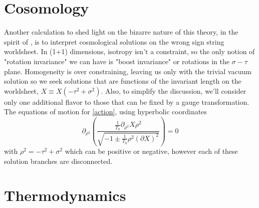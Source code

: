 \documentclass[%
 reprint,
 amsmath,amssymb,
 aps,
]{revtex4-1}
\begin{document}
\section{Cosomology}

Another calculation to shed light on the bizarre nature of this theory, in the spirit of \cite{Dubovsky:2012wk},
is to interpret cosmological solutions on the wrong sign string worldsheet. In (1+1) dimensions, isotropy isn't
a constraint, so the only notion of "rotation invariance" we can have is "boost invariance" or rotations in the
$\sigma-\tau$ plane.  Homogeneity is over constraining, leaving us only with the trivial vacuum solution so we seek
solutions that are functions of the invariant length on the worldsheet, $X \equiv X(-\tau^2 + \sigma^2)$.  Also, to
simplify the discussion, we'll consider only one additional flavor to those that can be fixed by a gauge
transformation. The equations of motion for \ref{action}, using hyperbolic coordinates
\begin{equation}
    \partial_{\rho^2} \left( \frac{\frac{1}{T_0} \partial_{\rho^2} X \rho^2}{\sqrt{-1 \pm \frac{1}{T_0} \rho^2 (\partial X)^2}} \right) = 0
\end{equation}
with $\rho^2 = -\tau^2 + \sigma^2$ which can be positive or negative, however each of these solution branches are disconnected.
\section{Thermodynamics}
\end{document}
